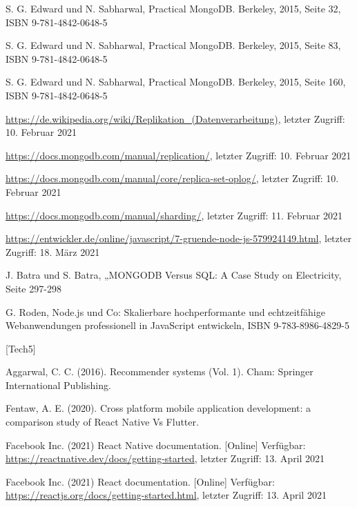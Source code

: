 \documentclass[11pt,a4paper]{article}
\begin{document}
\begin{itemize}
 S. G. Edward und N. Sabharwal, Practical MongoDB. Berkeley, 2015, Seite 32, ISBN 9-781-4842-0648-5

 S. G. Edward und N. Sabharwal, Practical MongoDB. Berkeley, 2015, Seite 83, ISBN 9-781-4842-0648-5

 S. G. Edward und N. Sabharwal, Practical MongoDB. Berkeley, 2015, Seite 160, ISBN 9-781-4842-0648-5

 \url{https://de.wikipedia.org/wiki/Replikation_(Datenverarbeitung)}, letzter Zugriff: 10. Februar 2021

 \url{https://docs.mongodb.com/manual/replication/}, letzter Zugriff: 10. Februar 2021

 \url{https://docs.mongodb.com/manual/core/replica-set-oplog/}, letzter Zugriff: 10. Februar 2021

 \url{https://docs.mongodb.com/manual/sharding/}, letzter Zugriff: 11. Februar 2021

%
%
%
%


 \url{https://entwickler.de/online/javascript/7-gruende-node-js-579924149.html}, letzter Zugriff: 18. März 2021

 J. Batra und S. Batra, „MONGODB Versus SQL: A Case Study on Electricity, Seite 297-298

 G. Roden, Node.js und Co: Skalierbare hochperformante und echtzeitfähige Webanwendungen professionell in JavaScript entwickeln, ISBN 9-783-8986-4829-5

[Tech5]


%
%
%
%
%


	 Aggarwal, C. C. (2016). Recommender systems (Vol. 1). Cham: Springer International Publishing.

	 Fentaw, A. E. (2020). Cross platform mobile application development: a comparison study of React Native Vs Flutter.

	 Facebook Inc. (2021) React Native documentation. [Online] Verfügbar: \url{https://reactnative.dev/docs/getting-started}, letzter Zugriff: 13. April 2021

	 Facebook Inc. (2021) React documentation. [Online] Verfügbar: \url{https://reactjs.org/docs/getting-started.html}, letzter Zugriff: 13. April 2021


\end{itemize}
\end{document}
